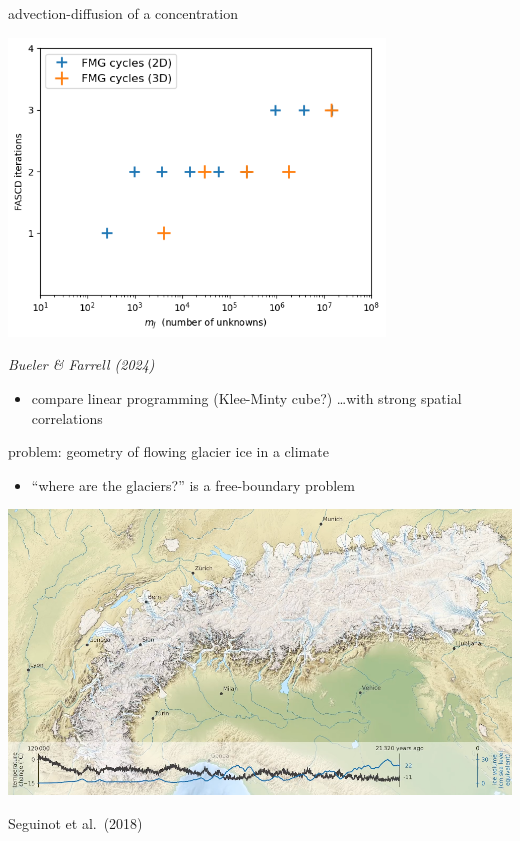 \documentclass[svgnames,
               hyperref={colorlinks,citecolor=DeepPink4,linkcolor=FireBrick,urlcolor=Maroon},
               usepdftitle=false]  %
               {beamer}
\begin{document}
\begin{frame}{advection-diffusion of a concentration}

\begin{center}
\includegraphics[width=0.75\textwidth]{figs/advdiff.png}
\end{center}

\vspace{-3mm}
\hfill \tiny \emph{Bueler \& Farrell (2024)}

\medskip
\scriptsize
\begin{itemize}
\item<2> compare linear programming (Klee-Minty cube?) \dots with strong spatial correlations
\end{itemize}
\end{frame}


\begin{frame}{problem: geometry of flowing glacier ice in a climate}

\begin{itemize}
\item ``where are the glaciers?'' is a free-boundary problem
\end{itemize}

\includegraphics[width=1.02\textwidth]{../talk-oxford/images/alps-seguinot2018.png}

\vspace{-2mm}
\hfill {\tiny Seguinot et al.~(2018)}
\end{frame}
\end{document}

